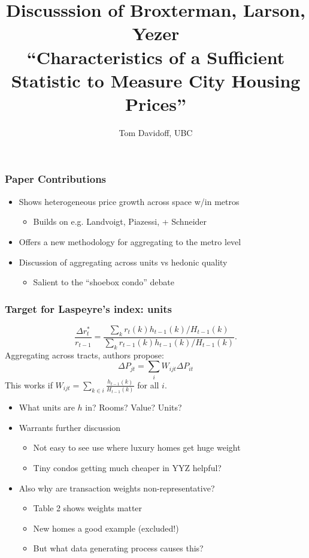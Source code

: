 \documentclass{beamer}
\begin{document}
\title{Discusssion of Broxterman, Larson, Yezer\\``Characteristics of a Sufficient Statistic to Measure City
Housing Prices''}
\author{Tom Davidoff, UBC}

\begin{frame}
	\titlepage
\end{frame}

\begin{frame}
	\frametitle{Paper Contributions}
	\begin{itemize}
		\item Shows heterogeneous price growth across space w/in metros
			\begin{itemize}
				\item Builds on e.g. Landvoigt, Piazessi, + Schneider
			\end{itemize}
		\item Offers a new methodology for aggregating to the metro level
		\item Discussion of aggregating across units vs hedonic quality  
			\begin{itemize}
				\item Salient to the ``shoebox condo'' debate
			\end{itemize}
	\end{itemize}
\end{frame}

\begin{frame}
	\frametitle{Target for Laspeyre's index: units}
	$$\frac{\Delta r^*_t}{r_{t-1}} = \frac{\sum_k r_t(k) h_{t-1}(k) / H_{t-1}(k)}{\sum_k r_{t-1}(k) h_{t-1}(k) / H_{t-1}(k)}.$$
	Aggregating across tracts, authors propose:
	$$\Delta P_{jt} = \sum_{i} W_{ijt} \Delta P_{it}$$
	This works if $W_{ijt} = \sum_{k\in i} \frac{h_{t-1}(k)}{H_{t-1}(k)}$ for all $i$.
	\begin{itemize}
		\item What units are $h$ in? Rooms? Value? Units?
		\item Warrants further discussion
			\begin{itemize}
				\item Not easy to see use where luxury homes get huge weight
				\item Tiny condos getting much cheaper in YYZ helpful?
			\end{itemize}
		\item Also why are transaction weights non-representative?
			\begin{itemize}
				\item Table 2 shows weights matter
				\item New homes a good example (excluded!)
				\item But what data generating process causes this?
			\end{itemize}
	\end{itemize}
\end{frame}
\end{document}
